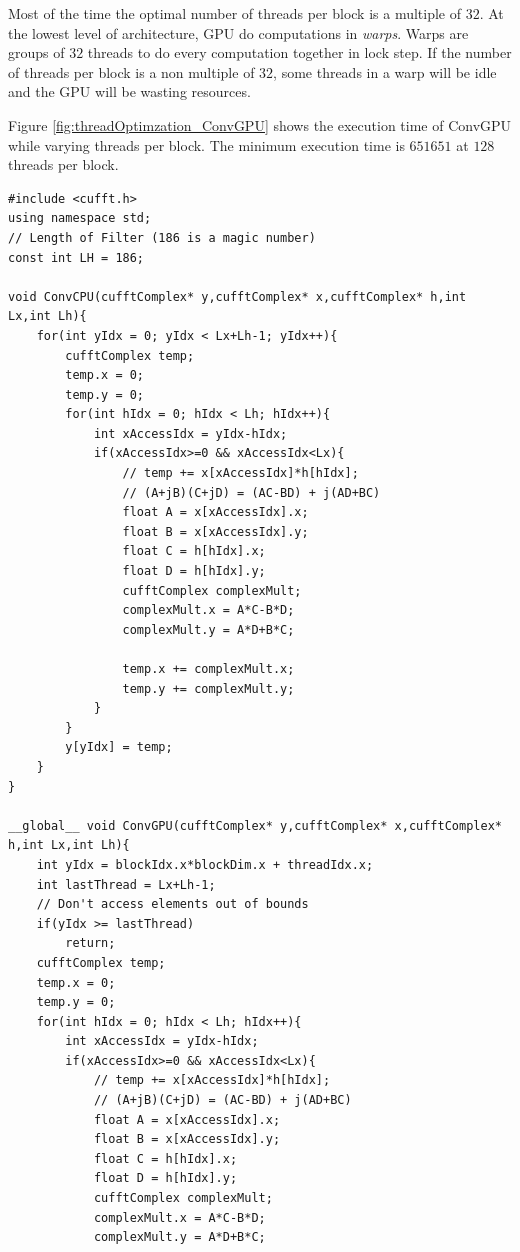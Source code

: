 Most of the time the optimal number of threads per block is a multiple of $32$. 
At the lowest level of architecture, GPU do computations in \textit{warps}.
Warps are groups of $32$ threads to do every computation together in lock step.
If the number of threads per block is a non multiple of $32$, some threads in a warp will be idle and the GPU will be wasting resources.

Figure \ref{fig:threadOptimzation_ConvGPU} shows the execution time of ConvGPU while varying threads per block.
The minimum execution time is $651651$ at $128$ threads per block.










\singlespacing
\clearpage
\begin{lstlisting}[caption={CUDA code to performing complex convolution four different ways: time domain CPU, time domain GPU, time domain GPU using shared memory and frequency domain GPU.},label={code:convFun}]
#include <cufft.h>
using namespace std;
// Length of Filter (186 is a magic number)
const int LH = 186;

void ConvCPU(cufftComplex* y,cufftComplex* x,cufftComplex* h,int Lx,int Lh){
	for(int yIdx = 0; yIdx < Lx+Lh-1; yIdx++){
		cufftComplex temp;
		temp.x = 0;
		temp.y = 0;
		for(int hIdx = 0; hIdx < Lh; hIdx++){
			int xAccessIdx = yIdx-hIdx;
			if(xAccessIdx>=0 && xAccessIdx<Lx){
				// temp += x[xAccessIdx]*h[hIdx];
				// (A+jB)(C+jD) = (AC-BD) + j(AD+BC)
				float A = x[xAccessIdx].x;
				float B = x[xAccessIdx].y;
				float C = h[hIdx].x;
				float D = h[hIdx].y;
				cufftComplex complexMult;
				complexMult.x = A*C-B*D;
				complexMult.y = A*D+B*C;

				temp.x += complexMult.x;
				temp.y += complexMult.y;
			}
		}
		y[yIdx] = temp;
	}
}

__global__ void ConvGPU(cufftComplex* y,cufftComplex* x,cufftComplex* h,int Lx,int Lh){
	int yIdx = blockIdx.x*blockDim.x + threadIdx.x;
	int lastThread = Lx+Lh-1;
	// Don't access elements out of bounds
	if(yIdx >= lastThread)
		return;
	cufftComplex temp;
	temp.x = 0;
	temp.y = 0;
	for(int hIdx = 0; hIdx < Lh; hIdx++){
		int xAccessIdx = yIdx-hIdx;
		if(xAccessIdx>=0 && xAccessIdx<Lx){
			// temp += x[xAccessIdx]*h[hIdx];
			// (A+jB)(C+jD) = (AC-BD) + j(AD+BC)
			float A = x[xAccessIdx].x;
			float B = x[xAccessIdx].y;
			float C = h[hIdx].x;
			float D = h[hIdx].y;
			cufftComplex complexMult;
			complexMult.x = A*C-B*D;
			complexMult.y = A*D+B*C;


\end{lstlisting}
